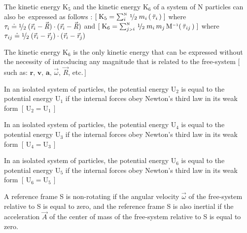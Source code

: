 \documentclass[10pt]{article}
\newcommand{\med}{\raise.5ex\hbox{$\scriptstyle 1$}\kern-.15em/\kern-.09em\lower.25ex\hbox{$\scriptstyle 2$}}
\begin{document}
\par \bigskip\smallskip \noindent The kinetic energy ${\mathrm{K}}_5$ and the kinetic energy ${\mathrm{K}}_6$ of a system of N particles can also \hbox {be expressed} as follows : $[ \; {\mathrm{K}}_5 = \sum_i^{\scriptscriptstyle{\mathrm{N}}} \, \med \; m_i \, ( \, {\ddot{\tau}}_{\hspace{+0.045em}i} \, ) \; ]$ where ${\tau}_{i} \doteq \med \; ({\vec{\mathit{r}}}_{i} - {\vec{\mathit{R}}}) \cdot ({\vec{\mathit{r}}}_{i} - {\vec{\mathit{R}}})$ and \hbox {$[ \; {\mathrm{K}}_6 = \sum_{j{\scriptscriptstyle >}i}^{\scriptscriptstyle{\mathrm{N}}} \, \med \; m_i \, m_j \, {\mathrm{M}}^{\scriptscriptstyle -1} ( \, {\ddot{\tau}}_{\hspace{+0.060em}ij} \, ) \; ]$} where ${\tau}_{\hspace{+0.060em}ij} \doteq \med \; ({\vec{\mathit{r}}}_{i} - {\vec{\mathit{r}}}_{j}) \cdot ({\vec{\mathit{r}}}_{i} - {\vec{\mathit{r}}}_{j})$

\par \bigskip\smallskip \noindent The kinetic energy ${\mathrm{K}}_6$ is the only kinetic energy that can be expressed without the necessity of introducing any magnitude that is related to the free-system $[ \, $such as: ${\mathbf{r}},\, {\mathbf{v}},\, {\mathbf{a}},\, {\vec{\omega}},\, {\vec{\mathit{R}}}$, etc.$ \, ]$

\par \bigskip\smallskip \noindent In an isolated system of particles, the potential energy ${\mathrm{U}}_2$ is equal to the potential energy ${\mathrm{U}}_1$ if the internal forces obey Newton's third law in its weak form $[ \, {\mathrm{U}}_2 = {\mathrm{U}}_1 \, ]$

\par \bigskip\smallskip \noindent In an isolated system of particles, the potential energy ${\mathrm{U}}_4$ is equal to the potential energy ${\mathrm{U}}_3$ if the internal forces obey Newton's third law in its weak form $[ \, {\mathrm{U}}_4 = {\mathrm{U}}_3 \, ]$

\par \bigskip\smallskip \noindent In an isolated system of particles, the potential energy ${\mathrm{U}}_6$ is equal to the potential energy ${\mathrm{U}}_5$ if the internal forces obey Newton's third law in its weak form $[ \, {\mathrm{U}}_6 = {\mathrm{U}}_5 \, ]$

\par \bigskip\smallskip \noindent A reference frame S is non-rotating if the angular velocity ${\vec{\omega}}$ of the free-system relative to S is equal to zero, and the reference frame S is also inertial if the acceleration ${\vec{\mathit{A}}}$ of the center of mass of the free-system relative to S is equal to zero.
\end{document}
